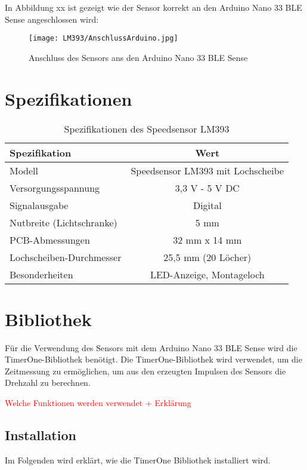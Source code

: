 In Abbildung xx ist gezeigt wie der Sensor korrekt an den Arduino Nano 33 BLE Sense angeschlossen wird:

\begin{figure}[H]
	\centering
	\texttt{[image: LM393/AnschlussArduino.jpg]}
	\caption{Anschluss des Sensors ans den Arduino Nano 33 BLE Sense}
	\label{fig:AnschlussArduinoLM393}
\end{figure}


\section{Spezifikationen}

\begin{table}[H]
	\centering
	\begin{tabular}{|l|c|}
		\hline
		\textbf{Spezifikation} & \textbf{Wert} \\
		\hline
		Modell & Speedsensor LM393 mit Lochscheibe \\
		Versorgungsspannung & 3,3 V - 5 V DC \\
		Signalausgabe & Digital \\
		Nutbreite (Lichtschranke) & 5 mm \\
		PCB-Abmessungen & 32 mm x 14 mm \\
		Lochscheiben-Durchmesser & 25,5 mm (20 Löcher) \\
		Besonderheiten & LED-Anzeige, Montageloch \\
		\hline
	\end{tabular}
	\caption{Spezifikationen des Speedsensor LM393}
	\label{tab:SpezifikationLM393}
\end{table}

\section{Bibliothek}

Für die Verwendung des Sensors mit dem Arduino Nano 33 BLE Sense wird die TimerOne-Bibliothek benötigt. Die TimerOne-Bibliothek wird verwendet, um die Zeitmessung zu ermöglichen, um aus den erzeugten Impulsen des Sensors die Drehzahl zu berechnen.

\textcolor{red}{Welche Funktionen werden verwendet + Erklärung}

\subsection{Installation}

Im Folgenden wird erklärt, wie die TimerOne Bibliothek installiert wird.


